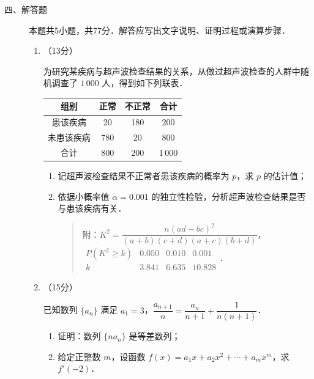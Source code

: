 \begin{description}
    \item[四、解答题] 本题共5小题，共77分．解答应写出文字说明、证明过程或演算步骤．
    \begin{enumerate}[leftmargin=5pt]
      \addtocounter{enumi}{+14}
        \item （13分）

        为研究某疾病与超声波检查结果的关系，从做过超声波检查的人群中随机调查了 $1\,000$ 人，得到如下列联表．
        \begin{table}[H]
        \centering
        \begin{tabular}{|c|c|c|c|}
        \hline
        \textbf{组别} & \textbf{正常} & \textbf{不正常} & \textbf{合计} \\
        \hline
        患该疾病 & 20 & 180 & 200 \\
        \hline
        未患该疾病 & 780 & 20 & 800 \\
        \hline
        合计 & 800 & 200 & 1\,000 \\
        \hline
        \end{tabular}
        \end{table}

        \begin{enumerate}[label=(\arabic*)]
            \item 记超声波检查结果不正常者患该疾病的概率为 $p$，求 $p$ 的估计值；
            \item 依据小概率值 $\alpha=0.001$ 的独立性检验，分析超声波检查结果是否与患该疾病有关．
            \begin{quote}
            附：$K^2=\dfrac{n(ad-bc)^2}{(a+b)(c+d)(a+c)(b+d)}$，\quad
            $\begin{array}{c|ccc}
            P(K^2\geqslant k) & 0.050 & 0.010 & 0.001 \\
            \hline
            k & 3.841 & 6.635 & 10.828
            \end{array}$．
            \end{quote}
        \end{enumerate}

        \item （15分）

        已知数列 $\{a_n\}$ 满足 $a_1=3$，$\dfrac{a_{n+1}}{n}=\dfrac{a_n}{n+1}+\dfrac{1}{n(n+1)}$．

        \begin{enumerate}[label=(\arabic*)]
            \item 证明：数列 $\{na_n\}$ 是等差数列；
            \item 给定正整数 $m$，设函数 $f(x)=a_1x+a_2x^2+\cdots+a_mx^m$，求 $f'(-2)$．
        \end{enumerate}


\end{enumerate}
\end{description}
